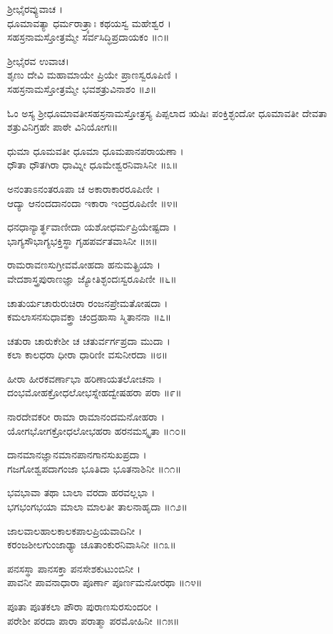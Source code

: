 ಶ್ರೀಭೈರವ್ಯುವಾಚ ।\\
ಧೂಮಾವತ್ಯಾ ಧರ್ಮರಾತ್ರ್ಯಾಃ ಕಥಯಸ್ವ ಮಹೇಶ್ವರ ।\\
ಸಹಸ್ರನಾಮಸ್ತೋತ್ರಮ್ಮೇ ಸರ್ವಸಿದ್ಧಿಪ್ರದಾಯಕಂ ॥೧॥

ಶ್ರೀಭೈರವ ಉವಾಚ।\\
ಶೃಣು ದೇವಿ ಮಹಾಮಾಯೇ ಪ್ರಿಯೇ ಪ್ರಾಣಸ್ವರೂಪಿಣಿ ।\\
ಸಹಸ್ರನಾಮಸ್ತೋತ್ರಮ್ಮೇ ಭವಶತ್ರುವಿನಾಶಂ ॥೨॥

ಓಂ ಅಸ್ಯ ಶ್ರೀಧೂಮಾವತೀಸಹಸ್ರನಾಮಸ್ತೋತ್ರಸ್ಯ ಪಿಪ್ಪಲಾದ ಋಷಿಃ ಪಂಕ್ತಿಶ್ಛಂದೋ ಧೂಮಾವತೀ ದೇವತಾ ಶತ್ರುವಿನಿಗ್ರಹೇ ಪಾಠೇ ವಿನಿಯೋಗಃ॥

ಧುಮಾ ಧೂಮವತೀ ಧೂಮಾ ಧೂಮಪಾನಪರಾಯಣಾ ।\\
ಧೌತಾ ಧೌತಗಿರಾ ಧಾಮ್ನೀ ಧೂಮೇಶ್ವರನಿವಾಸಿನೀ ॥೩॥

ಅನಂತಾಽನಂತರೂಪಾ ಚ ಅಕಾರಾಕಾರರೂಪಿಣೀ ।\\
ಆದ್ಯಾ ಆನಂದದಾನಂದಾ ಇಕಾರಾ ಇಂದ್ರರೂಪಿಣೀ ॥೪॥

ಧನಧಾನ್ಯಾರ್ತ್ಥವಾಣೀದಾ ಯಶೋಧರ್ಮಪ್ರಿಯೇಷ್ಟದಾ ।\\
ಭಾಗ್ಯಸೌಭಾಗ್ಯಭಕ್ತಿಸ್ಥಾ ಗೃಹಪರ್ವತವಾಸಿನೀ ॥೫॥

ರಾಮರಾವಣಸುಗ್ರೀವಮೋಹದಾ ಹನುಮತ್ಪ್ರಿಯಾ ।\\
ವೇದಶಾಸ್ತ್ರಪುರಾಣಜ್ಞಾ ಜ್ಯೋತಿಶ್ಛಂದಃಸ್ವರೂಪಿಣೀ ॥೬॥

ಚಾತುರ್ಯಚಾರುರುಚಿರಾ ರಂಜನಪ್ರೇಮತೋಷದಾ ।\\
ಕಮಲಾಸನಸುಧಾವಕ್ತ್ರಾ ಚಂದ್ರಹಾಸಾ ಸ್ಮಿತಾನನಾ ॥೭॥

ಚತುರಾ ಚಾರುಕೇಶೀ ಚ ಚತುರ್ವರ್ಗಪ್ರದಾ ಮುದಾ ।\\
ಕಲಾ ಕಾಲಧರಾ ಧೀರಾ ಧಾರಿಣೀ ವಸುನೀರದಾ ॥೮॥

ಹೀರಾ ಹೀರಕವರ್ಣಾಭಾ ಹರಿಣಾಯತಲೋಚನಾ ।\\
ದಂಭಮೋಹಕ್ರೋಧಲೋಭಸ್ನೇಹದ್ವೇಷಹರಾ ಪರಾ ॥೯॥

ನಾರದೇವಕರೀ ರಾಮಾ ರಾಮಾನಂದಮನೋಹರಾ ।\\
ಯೋಗಭೋಗಕ್ರೋಧಲೋಭಹರಾ ಹರನಮಸ್ಕೃತಾ ॥೧೦॥

ದಾನಮಾನಜ್ಞಾನಮಾನಪಾನಗಾನಸುಖಪ್ರದಾ ।\\
ಗಜಗೋಶ್ವಪದಾಗಂಜಾ ಭೂತಿದಾ ಭೂತನಾಶಿನೀ ॥೧೧॥

ಭವಭಾವಾ ತಥಾ ಬಾಲಾ ವರದಾ ಹರವಲ್ಲಭಾ ।\\
ಭಗಭಂಗಭಯಾ ಮಾಲಾ ಮಾಲತೀ ತಾಲನಾಹೃದಾ ॥೧೨॥

ಜಾಲವಾಲಹಾಲಕಾಲಕಪಾಲಪ್ರಿಯವಾದಿನೀ ।\\
ಕರಂಜಶೀಲಗುಂಜಾಢ್ಯಾ ಚೂತಾಂಕುರನಿವಾಸಿನೀ ॥೧೩॥

ಪನಸಸ್ಥಾ ಪಾನಸಕ್ತಾ ಪನಸೇಶಕುಟುಂಬಿನೀ ।\\
ಪಾವನೀ ಪಾವನಾಧಾರಾ ಪೂರ್ಣಾ ಪೂರ್ಣಮನೋರಥಾ ॥೧೪॥

ಪೂತಾ ಪೂತಕಲಾ ಪೌರಾ ಪುರಾಣಸುರಸುಂದರೀ ।\\
ಪರೇಶೀ ಪರದಾ ಪಾರಾ ಪರಾತ್ಮಾ ಪರಮೋಹಿನೀ ॥೧೫॥

